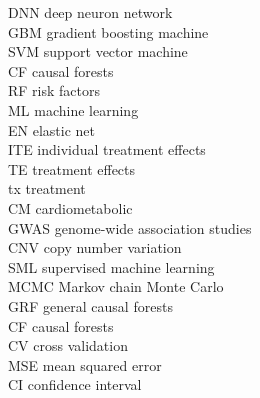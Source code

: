\newpage
\noindent
DNN       \hfill deep neuron network                  \\
GBM       \hfill gradient boosting machine            \\
SVM       \hfill support vector machine               \\
CF        \hfill causal forests                       \\
RF        \hfill risk factors                         \\
ML        \hfill machine learning                     \\
EN        \hfill elastic net                          \\
ITE       \hfill individual treatment effects         \\
TE        \hfill treatment effects                    \\
tx        \hfill treatment                            \\
CM        \hfill cardiometabolic                      \\
GWAS      \hfill genome-wide association studies      \\
CNV       \hfill copy number variation                \\
SML       \hfill supervised machine learning          \\ 
MCMC      \hfill Markov chain Monte Carlo             \\
GRF       \hfill general causal forests               \\
CF        \hfill causal forests                       \\
CV        \hfill cross validation                     \\
MSE       \hfill mean squared error                   \\
CI        \hfill confidence interval                  \\

